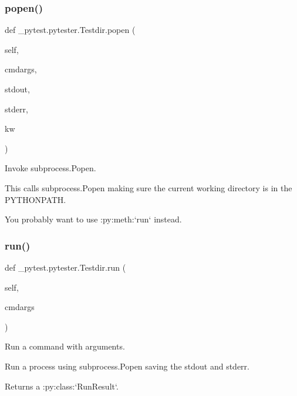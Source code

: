 \subsubsection{\texorpdfstring{popen()}{popen()}}
{\footnotesize\ttfamily def \+\_\+pytest.\+pytester.\+Testdir.\+popen (\begin{DoxyParamCaption}\item[{}]{self,  }\item[{}]{cmdargs,  }\item[{}]{stdout,  }\item[{}]{stderr,  }\item[{}]{kw }\end{DoxyParamCaption})}

\begin{DoxyVerb}Invoke subprocess.Popen.

This calls subprocess.Popen making sure the current working directory
is in the PYTHONPATH.

You probably want to use :py:meth:`run` instead.\end{DoxyVerb}
 \mbox{\label{class__pytest_1_1pytester_1_1_testdir_af7b50df501fe7b4775e0ab1a47648d87}} 
\subsubsection{\texorpdfstring{run()}{run()}}
{\footnotesize\ttfamily def \+\_\+pytest.\+pytester.\+Testdir.\+run (\begin{DoxyParamCaption}\item[{}]{self,  }\item[{}]{cmdargs }\end{DoxyParamCaption})}

\begin{DoxyVerb}Run a command with arguments.

Run a process using subprocess.Popen saving the stdout and stderr.

Returns a :py:class:`RunResult`.\end{DoxyVerb}
 \mbox{\label{class__pytest_1_1pytester_1_1_testdir_a65252fa712e7952bb810a29fbbc6dc0f}} 
